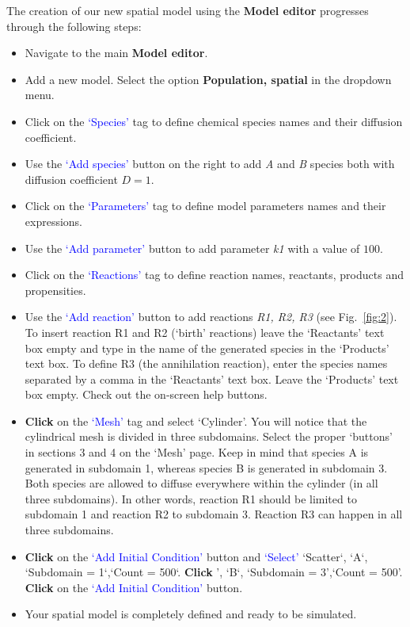 The creation of our new spatial model using the \textbf{Model editor} progresses through the following steps:
\begin{itemize}
\item Navigate to the main \textbf{Model editor}.
\item Add a new model. Select the option \textbf{Population, spatial} in the dropdown menu.
 \item Click on the \textcolor{blue}{`Species'} tag to define chemical species names and their diffusion coefficient. 
 \item Use the \textcolor{blue}{`Add species'} button on the right to add \textit{A} and \textit{B} species both with diffusion coefficient $D=1$.
 \item Click on the \textcolor{blue}{`Parameters'} tag to define model parameters names and their expressions. 
 \item Use the \textcolor{blue}{`Add parameter'} button to add parameter \textit{k1} with a value of $100$.
 \item Click on the \textcolor{blue}{`Reactions'} tag to define reaction names, reactants, products and propensities.
 \item Use the \textcolor{blue}{`Add reaction'} button to add reactions \textit{R1, R2, R3} (see Fig.~\ref{fig:2}). To insert reaction R1 and R2 (`birth' reactions) leave the `Reactants' text box empty and type in the name of the generated species in the `Products' text box.
 To define R3 (the annihilation reaction), enter the species names separated by a comma in the 
`Reactants' text box. Leave the `Products' text box empty. Check out the on-screen help buttons.
 \item \textbf{Click} on the \textcolor{blue}{`Mesh'} tag and select `Cylinder'. You will notice that the cylindrical mesh is divided in three subdomains. Select the proper `buttons' in sections 3 and 4 on the `Mesh' page. Keep in mind that species A is generated in subdomain 1, whereas species B is generated in subdomain 3. Both species are allowed to diffuse everywhere within the cylinder (in all three subdomains). In other words, reaction R1 should be limited to subdomain 1 and reaction R2 to subdomain 3. Reaction R3 can happen in all three subdomains.
  \item \textbf{Click} on the \textcolor{blue}{`Add Initial Condition'} button and \textcolor{blue}{`Select'} `Scatter`, `A`, `Subdomain = 1`,`Count = 500`. \textbf{Click} ', `B`, `Subdomain = 3',`Count = 500'. \textbf{Click} on the \textcolor{blue}{`Add Initial Condition'} button.
\item Your spatial model is completely defined and ready to be simulated.


\end{itemize}
